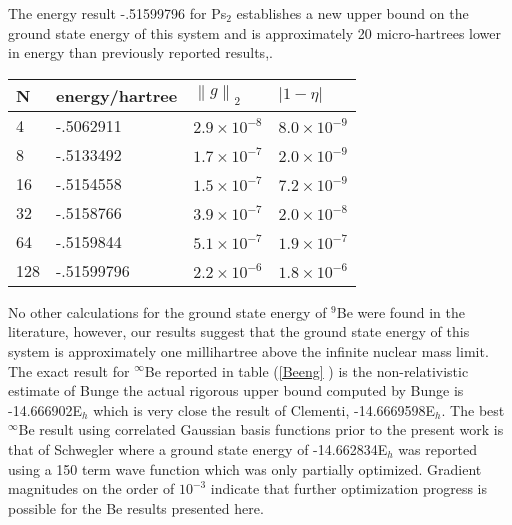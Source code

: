 \documentclass[12pt,thmsa,suthesis,verbatim]{report}
\begin{document}
The energy result -.51599796 for Ps$_2$ establishes a new upper bound on the
ground state energy of this system and is approximately 20 micro-hartrees
lower in energy than previously reported results\cite{Kozlowski93b},\cite
{Kinghorn93}.

\begin{tabular}{llll}
\hline\hline
N & energy/hartree & $\left\| g\right\| _2$ & $\left| 1-\eta \right| $ \\ 
\hline
4 & -.5062911 & $2.9\times 10^{-8}$ & $8.0\times 10^{-9}$ \\ 
8 & -.5133492 & $1.7\times 10^{-7}$ & $2.0\times 10^{-9}$ \\ 
16 & -.5154558 & $1.5\times 10^{-7}$ & $7.2\times 10^{-9}$ \\ 
32 & -.5158766 & $3.9\times 10^{-7}$ & $2.0\times 10^{-8}$ \\ 
64 & -.5159844 & $5.1\times 10^{-7}$ & $1.9\times 10^{-7}$ \\ 
128 & -.51599796 & $2.2\times 10^{-6}$ & $1.8\times 10^{-6}$ \\ \hline\hline
\end{tabular}
\caption{Ps$_{2}$ energy calculations using from 4 to 128 basis functions
 Optimization using TN\label{Ps2eng}}

No other calculations for the ground state energy of $^9$Be were found in
the literature, however, our results suggest that the ground state energy of
this system is approximately one millihartree above the infinite nuclear
mass limit. The exact result for $^\infty $Be reported in table (\ref{Beeng}%
) is the non-relativistic estimate of Bunge\cite{Bunge76} the actual
rigorous upper bound computed by Bunge is -14.666902E$_h$ which is very
close the result of Clementi, -14.6669598E$_h.$ The best $^\infty $Be result
using correlated Gaussian basis functions prior to the present work is that
of Schwegler\cite{Schwegler93} where a ground state energy of -14.662834E$_h$
was reported using a 150 term wave function which was only partially
optimized. Gradient magnitudes on the order of $10^{-3}$ indicate that
further optimization progress is possible for the Be results presented here.
\end{document}
